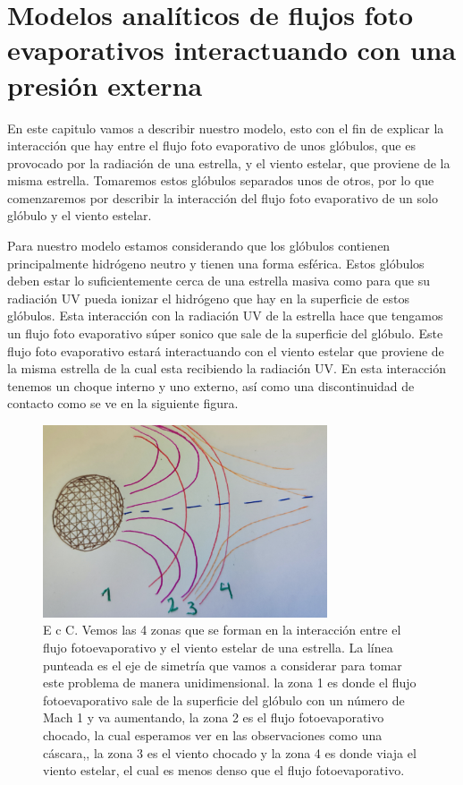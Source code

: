 \documentclass{book}
\begin{document}
\chapter{Modelos analíticos de flujos foto evaporativos interactuando con una presión externa}

En este capitulo vamos  a describir nuestro modelo, esto con el fin de explicar la interacción que hay entre el flujo foto evaporativo de unos glóbulos, que es provocado por la radiación de una estrella, y el viento estelar, que proviene de la misma estrella. Tomaremos estos glóbulos separados unos de otros, por lo que comenzaremos por describir la interacción del flujo foto evaporativo de un solo glóbulo y el viento estelar.

Para nuestro modelo estamos considerando que los glóbulos contienen principalmente hidrógeno neutro y tienen una forma esférica. Estos glóbulos deben estar lo suficientemente cerca de una estrella masiva como para que su radiación UV pueda ionizar el hidrógeno que hay en la superficie de estos glóbulos. Esta interacción con la radiación UV de la estrella hace que tengamos un flujo foto evaporativo súper sonico que sale de la superficie del glóbulo. Este flujo foto evaporativo estará interactuando con el viento estelar que proviene de la misma estrella de la cual esta recibiendo la radiación UV. En esta interacción tenemos un choque interno y uno externo, así como una discontinuidad de contacto como se ve en la siguiente figura.

\begin{figure}[h]
    \centering
    \includegraphics[width=0.75\textwidth]{Chp2_Zone.jpg}
    \caption{E c C.
    Vemos las 4 zonas que se forman en la interacción entre el flujo fotoevaporativo y el viento estelar de una estrella. La línea punteada es el eje de simetría que vamos a considerar para tomar este problema de manera unidimensional. la zona 1 es donde el flujo fotoevaporativo sale de la superficie del glóbulo con un número de Mach 1 y va aumentando, la zona 2 es el flujo fotoevaporativo chocado, la cual esperamos ver en las observaciones como una cáscara,, la zona 3 es el viento chocado y la zona 4 es donde viaja el viento estelar, el cual es menos denso que el flujo fotoevaporativo.}
    \label{fig:zones}
\end{figure}
\end{document}
